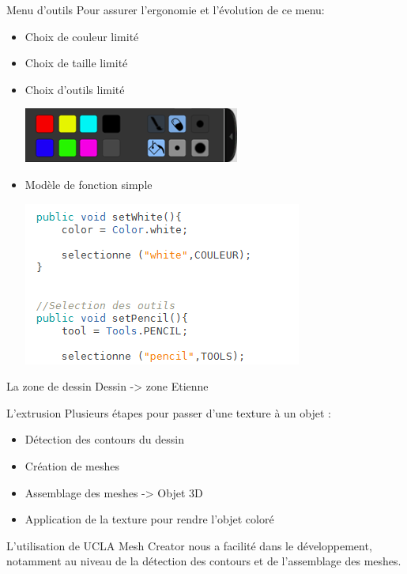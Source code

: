 \documentclass[a4paper,10pt]{beamer}
\begin{document}
	\begin{frame}{Menu d'outils}
		Pour assurer l'ergonomie et l'évolution de ce menu:
			\begin{itemize}
				\item Choix de couleur limité
				\item Choix de taille limité
				\item Choix d'outils limité
					\centerline{\includegraphics[scale=0.4]{images/Nono/img7.png}} 
				\item Modèle de fonction simple
							\centerline{\includegraphics[scale=0.6]{images/Nono/img8.png}} 
			\end{itemize}


	\end{frame}
	
	\begin{frame}{La zone de dessin}
		Dessin -> zone Etienne
	\end{frame}
	
	\begin{frame}{L'extrusion}
		Plusieurs étapes pour passer d'une texture à un objet :
		\begin{itemize}
			\item Détection des contours du dessin
			\item Création de meshes
			\item Assemblage des meshes -> Objet 3D
			\item Application de la texture pour rendre l'objet coloré
		\end{itemize}
		
		L'utilisation de UCLA Mesh Creator nous a facilité dans le développement, notamment au niveau de la détection des contours et de l'assemblage des meshes.
	\end{frame}
		
\end{document}

